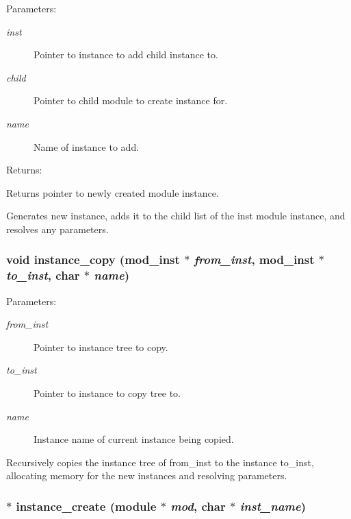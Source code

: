 \begin{Desc}
\item[Parameters: ]\par
\begin{description}
\item[{\em 
inst}]Pointer to instance to add child instance to. \item[{\em 
child}]Pointer to child module to create instance for. \item[{\em 
name}]Name of instance to add.\end{description}
\end{Desc}
\begin{Desc}
\item[Returns: ]\par
Returns pointer to newly created module instance.\end{Desc}
Generates new instance, adds it to the child list of the inst module instance, and resolves any parameters. 
\subsubsection{\setlength{\rightskip}{0pt plus 5cm}void instance\_\-copy ({\bf mod\_\-inst} $\ast$ {\em from\_\-inst}, {\bf mod\_\-inst} $\ast$ {\em to\_\-inst}, char $\ast$ {\em name})}\label{instance_8c_a7}


\begin{Desc}
\item[Parameters: ]\par
\begin{description}
\item[{\em 
from\_\-inst}]Pointer to instance tree to copy. \item[{\em 
to\_\-inst}]Pointer to instance to copy tree to. \item[{\em 
name}]Instance name of current instance being copied.\end{description}
\end{Desc}
Recursively copies the instance tree of from\_\-inst to the instance  to\_\-inst, allocating memory for the new instances and resolving parameters. 
\subsubsection{$\ast$ instance\_\-create ({\bf module} $\ast$ {\em mod}, char $\ast$ {\em inst\_\-name})}\label{instance_8c_a0}



